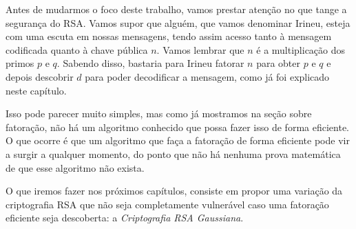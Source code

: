 Antes de mudarmos o foco deste trabalho, vamos prestar aten\c{c}\~ao no que tange a seguran\c{c}a do RSA. Vamos supor que algu\'em, que vamos denominar Irineu, esteja com uma escuta em nossas mensagens, tendo assim acesso tanto \`a mensagem codificada quanto \`a chave p\'ublica $n$. Vamos lembrar que $n$ \'e a multiplica\c{c}\~ ao dos primos $p$ e $q$. Sabendo disso, bastaria para Irineu fatorar $n$ para obter $p$ e $q$ e depois descobrir $d$ para poder decodificar a mensagem, como j\'a foi explicado neste cap\'itulo.

Isso pode parecer muito simples, mas como j\'a mostramos na se\c{c}\~ao sobre fatora\c{c}\~ao, n\~ao h\'a um algoritmo conhecido que possa fazer isso de forma eficiente. O que ocorre \'e que um algoritmo que fa\c{c}a a fatora\c{c}\~ao de forma eficiente pode vir a surgir a qualquer momento, do ponto que n\~ao h\'a nenhuma prova matem\'atica de que esse algoritmo n\~ao exista.

O que iremos fazer nos pr\'oximos cap\'itulos, consiste em propor uma varia\c{c}\~ao da criptografia RSA que n\~ao seja completamente vulner\'avel caso uma fatora\c{c}\~ao eficiente seja descoberta: a \textit{Criptografia RSA Gaussiana}.
